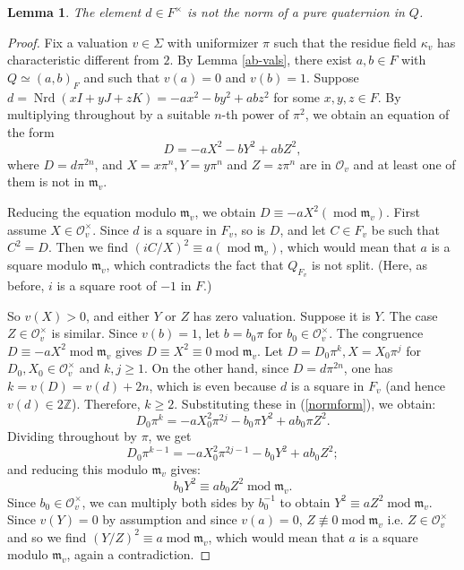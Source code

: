 \documentclass[11pt,letterpaper]{amsart}
\theoremstyle{plain}
\newtheorem{lemma}[theorem]{Lemma}
\theoremstyle{definition}
\theoremstyle{remark}
\begin{document}
\begin{lemma}\label{not-pure-quat-norm}
    The element $d\in F^\times$ is not the norm of a pure quaternion in $Q$.
\end{lemma}
\begin{proof}
    Fix a valuation $v\in \Sigma$ with uniformizer $\pi$ such that the residue field $\kappa_v$ has characteristic different from $2$. By Lemma \ref{ab-vals}, there exist $a,b\in F$ with $Q\simeq (a,b)_F$ and such that $v(a) = 0$ and $v(b)=1$.
    Suppose $d = \operatorname{Nrd}(xI + yJ + zK) = -ax^2-by^2+abz^2$ for some $x,y,z\in F$. By multiplying throughout by a suitable $n$-th power of $\pi^2$, we obtain an equation of the form
    \begin{equation}\label{normform}
        D = -aX^2-bY^2 + abZ^2,
    \end{equation} where $D = d\pi^{2n}$, and $X = x\pi^{n},Y = y\pi^{n}$ and $Z = z\pi^{n}$ are in $\mathcal{O}_v$ and at least one of them is not in $\mathfrak{m}_v$. 
    
    Reducing the equation modulo $\mathfrak{m}_v$, we obtain $D\equiv -aX^2(\operatorname{mod}\mathfrak{m}_v)$. First assume $X\in\mathcal{O}_v^\times$. Since $d$ is a square in $F_v$, so is $D$, and let $C\in F_v$ be such that $C^2 = D$. Then we find $(iC/X)^2\equiv a(\operatorname{mod}\mathfrak{m}_v)$, which would mean that $a$ is a square modulo $\mathfrak{m}_v$, which contradicts the fact that $Q_{F_v}$ is not split. (Here, as before, $i$ is a square root of $-1$ in $F$.)

    So $v(X)>0$, and either $Y$ or $Z$ has zero valuation. Suppose it is $Y$. The case $Z\in\mathcal{O}_v^\times$ is similar. Since $v(b) = 1$, let $b = b_0\pi$ for $b_0\in\mathcal{O}_v^\times$. The congruence $D\equiv -aX^2\operatorname{mod}\mathfrak{m}_v$ gives $D\equiv X^2\equiv 0\operatorname{mod}\mathfrak{m}_v$. Let $D = D_0\pi^k, X= X_0\pi^j$ for $D_0,X_0\in\mathcal{O}_v^\times$ and $k,j\geq 1$. On the other hand, since $D = d\pi^{2n}$, one has $k = v(D) = v(d) + 2n$, which is even because $d$ is a square in $F_v$ (and hence $v(d)\in 2\mathbb{Z}$). Therefore, $k\geq 2$. Substituting these in (\ref{normform}), we obtain:\begin{equation}
        D_0\pi^k = -aX_0^2\pi^{2j} - b_0\pi Y^2 + ab_0\pi Z^2.
    \end{equation}
    Dividing throughout by $\pi$, we get
    \begin{equation}
        D_0\pi^{k-1} = -aX_0^2\pi^{2j-1} - b_0Y^2 + ab_0Z^2;
    \end{equation}
    and reducing this modulo $\mathfrak{m}_v$ gives:\begin{equation}
        b_0Y^2\equiv ab_0Z^2\operatorname{mod}\mathfrak{m}_v.
    \end{equation}
    Since $b_0\in\mathcal{O}_v^\times$, we can multiply both sides by $b_0^{-1}$ to obtain $Y^2\equiv aZ^2\operatorname{mod}\mathfrak{m}_v$. Since $v(Y) = 0$ by assumption and since $v(a)=0$, $Z\not\equiv 0\operatorname{mod}\mathfrak{m}_v$ i.e. $Z\in\mathcal{O}_v^\times$ and so we find $(Y/Z)^2\equiv a\operatorname{mod}\mathfrak{m}_v$, which would mean that $a$ is a square modulo $\mathfrak{m}_v$, again a contradiction.
\end{proof}
\end{document}
